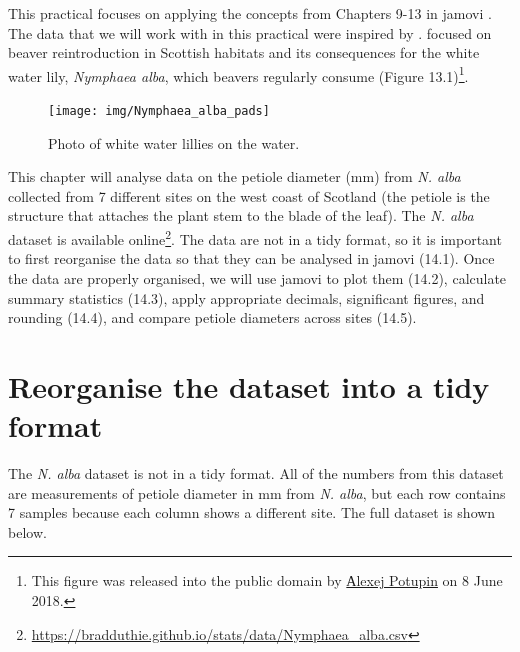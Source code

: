 \documentclass[
]{scrbook}
\begin{document}
This practical focuses on applying the concepts from Chapters 9-13 in jamovi \citep{Jamovi2022}.
The data that we will work with in this practical were inspired by \citet{Law2014}.
\citet{Law2014} focused on beaver reintroduction in Scottish habitats and its consequences for the white water lily, \emph{Nymphaea alba}, which beavers regularly consume (Figure 13.1)\footnote{This figure was released into the public domain by \href{https://commons.wikimedia.org/wiki/File:Nymphaea_alba._Reader.jpg}{Аlexej Potupin} on 8 June 2018.}.

\begin{figure}
\texttt{[image: img/Nymphaea\_alba\_pads]} \caption{Photo of white water lillies on the water.}\label{fig:unnamed-chunk-48}
\end{figure}

This chapter will analyse data on the petiole diameter (mm) from \emph{N. alba} collected from 7 different sites on the west coast of Scotland (the petiole is the structure that attaches the plant stem to the blade of the leaf).
The \emph{N. alba} dataset is available online\footnote{\url{https://bradduthie.github.io/stats/data/Nymphaea_alba.csv}}.
The data are not in a tidy format, so it is important to first reorganise the data so that they can be analysed in jamovi (14.1).
Once the data are properly organised, we will use jamovi to plot them (14.2), calculate summary statistics (14.3), apply appropriate decimals, significant figures, and rounding (14.4), and compare petiole diameters across sites (14.5).

\hypertarget{reorganise-the-dataset-into-a-tidy-format}{%
\section{Reorganise the dataset into a tidy format}\label{reorganise-the-dataset-into-a-tidy-format}}

The \emph{N. alba} dataset is not in a tidy format.
All of the numbers from this dataset are measurements of petiole diameter in mm from \emph{N. alba}, but each row contains 7 samples because each column shows a different site.
The full dataset is shown below.
\end{document}
